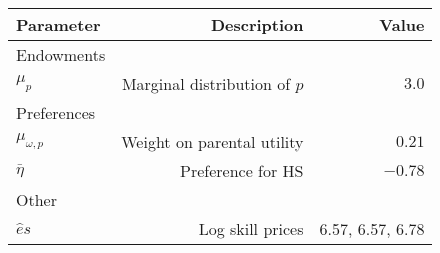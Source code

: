 \begin{tabular}{lrr}
\hline
Parameter & Description  & Value  \\ 
\hline
Endowments &   &   \\ 
$\mu_{p}$ & Marginal distribution of $p$  & $3.0$  \\ 
Preferences &   &   \\ 
$\mu_{\omega,p}$ & Weight on parental utility  & $0.21$  \\ 
$\bar{\eta}$ & Preference for HS  & $-0.78$  \\ 
Other &   &   \\ 
$\hat{e}{s}$ & Log skill prices  & 6.57, 6.57, 6.78  \\ 
\hline
\end{tabular}%
